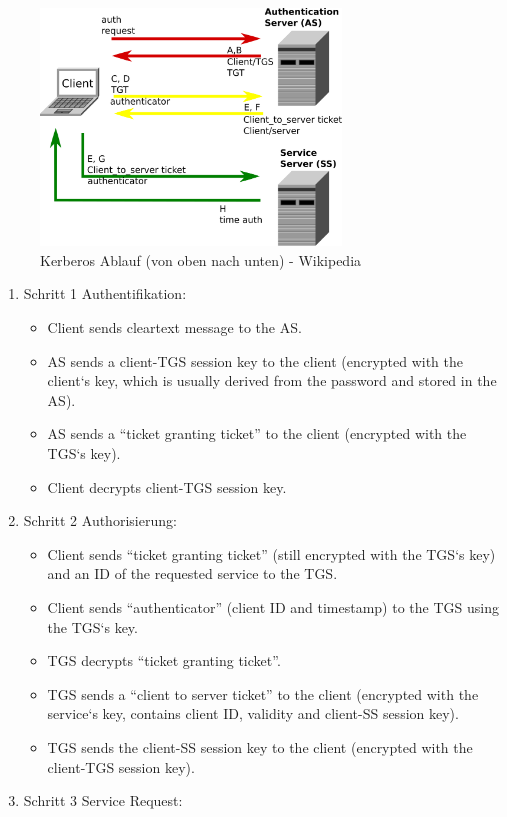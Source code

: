 \documentclass{article} %
\begin{document}
\begin{figure}[ht]
	\centering
  \includegraphics[width=8cm]{img/kerberos.png}
	\caption{Kerberos Ablauf (von oben nach unten) - Wikipedia}
\end{figure}
	\begin{enumerate}
	\item Schritt 1 Authentifikation: 
		\begin{itemize}
		\item Client sends cleartext message to the AS. 
		\item AS sends a client-TGS session key to the client (encrypted 
		with the client‘s key, which is usually derived from the 
		password and stored in the AS). 
		\item AS sends a "`ticket granting ticket"' to the client (encrypted 
		with the TGS‘s key). 
		\item Client decrypts client-TGS session key. 
		\end{itemize}
	\item Schritt 2 Authorisierung: 
		\begin{itemize}
		\item Client sends "`ticket granting ticket"' (still encrypted with the 
		TGS‘s key) and an ID of the requested service to the TGS. 
		\item Client sends "`authenticator"' (client ID and timestamp) to the 
		TGS using the TGS‘s key. 
		\item TGS decrypts "`ticket granting ticket"'. 
		\item TGS sends a "`client to server ticket"' to the client (encrypted 
		with the service‘s key, contains client ID, validity and client-SS 
		session key). 
		\item TGS sends the client-SS session key to the client (encrypted 
		with the client-TGS session key).
		\end{itemize}
	\item Schritt 3 Service Request: 

\end{enumerate}
\end{document}
